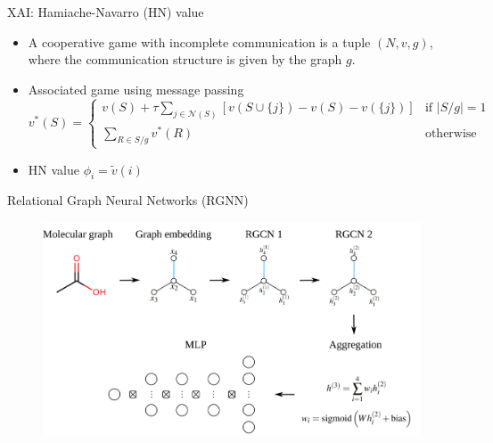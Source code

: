 \documentclass[aspectratio=169]{beamer}
\begin{document}
\begin{frame}{XAI: Hamiache-Navarro (HN) value}

    \begin{itemize}
        \item A cooperative game with incomplete communication is a tuple 
        $(N, v, g)$, where the communication structure is given by 
        the graph $g$.

        \item Associated game using message passing 
        \begin{equation}
            \label{eq:associated_game}
            v^*(S) =
            \begin{cases}
                \displaystyle
                v(S) + \tau \sum_{j \in \mathcal{N}(S)} \left[ v(S \cup \{j\}) - v(S) - v(\{j\}) \right] & \text{if } |S/g| = 1 \\
                \displaystyle
                \sum_{R \in S/g} v^*(R)                                                                   & \text{otherwise}
            \end{cases}
        \end{equation}

        \item HN value $\phi_i = \tilde{v}(i)$

    \end{itemize}



\end{frame}


\begin{frame}{Relational Graph Neural Networks (RGNN)}

    \begin{figure}[h]
        \centering
        \includegraphics[scale=0.75]{../thesis/Fig/rgcn_model.png}
    \end{figure}
   
\end{frame}
\end{document}
